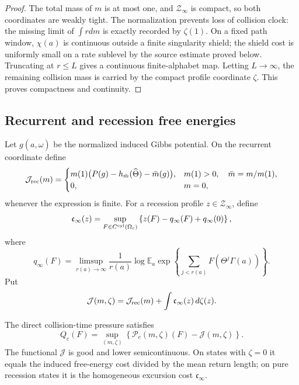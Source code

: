 \begin{proof}
The total mass of \(m\) is at most one, and \(\mathcal Z_\infty\) is compact,
so both coordinates are weakly tight.  The normalization prevents loss of
collision clock: the missing limit of \(\int rdm\) is exactly recorded by
\(\zeta(1)\).  On a fixed path window, \(\chi(a)\) is continuous outside a
finite singularity shield; the shield cost is uniformly small on a rate
sublevel by the source estimate proved below.  Truncating at \(r\le L\) gives
a continuous finite-alphabet map.  Letting \(L\to\infty\), the remaining
collision mass is carried by the compact profile coordinate \(\zeta\).  This
proves compactness and continuity.
\end{proof}

\subsection{Recurrent and recession free energies}

Let \(g(a,\widehat\omega)\) be the normalized induced Gibbs potential.  On
the recurrent coordinate define
\[
\mathcal J_{\rm rec}(m)=
\begin{cases}
 m(1)\bigl(P(g)-h_{\bar m}(\widehat\Theta)-\bar m(g)\bigr),
 &m(1)>0,\quad\bar m=m/m(1),\\
0,&m=0,
\end{cases}
\]
whenever the expression is finite.  For a recession profile
\(z\in\mathcal Z_\infty\), define
\[
\mathfrak c_\infty(z)=
\sup_{F\in C^{\rm cyl}(\Omega_c)}
\left\{z(F)-q_\infty(F)+q_\infty(0)\right\},
\]
where
\[
q_\infty(F)=\limsup_{r(a)\to\infty}
\frac1{r(a)}\log
\mathbb E_a\exp\left\{
\sum_{j<r(a)}F(\Theta^j\Gamma(a))
\right\}.
\]
Put
\[
\mathcal J(m,\zeta)=
\mathcal J_{\rm rec}(m)+
\int\mathfrak c_\infty(z)\,d\zeta(z).
\]

\begin{theorem}
\label{thm:r6-a3-variational}
The direct collision-time pressure satisfies
\[
Q_c(F)=\sup_{(m,\zeta)}
\left\{
\mathscr P_c(m,\zeta)(F)-\mathcal J(m,\zeta)
\right\}.
\]
The functional \(\mathcal J\) is good and lower semicontinuous.  On states
with \(\zeta=0\) it equals the induced free-energy cost divided by the mean
return length; on pure recession states it is the homogeneous excursion cost
\(\mathfrak c_\infty\).
\end{theorem}

